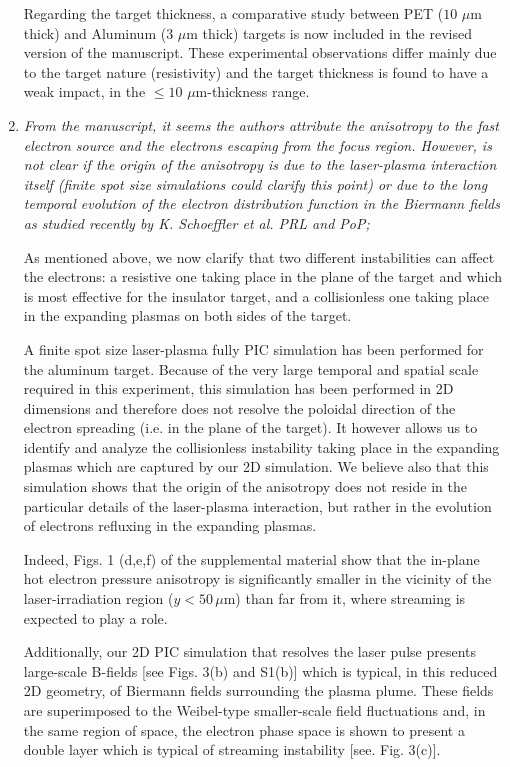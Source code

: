 \documentclass[aps,showpacs,superscriptaddress]{revtex4}%
\begin{document}
\begin{enumerate}
Regarding the target thickness, a comparative study between PET ($10$ $\mu$m thick) and Aluminum  (3 $\mu$m thick)  targets is now included in the revised version of the manuscript. These experimental observations differ mainly due to the target nature (resistivity) and the target thickness is found to have a weak impact, in the $\le 10$  $\mu$m-thickness range.

\item \textit{From the manuscript, it seems the authors attribute the anisotropy to the fast electron source and the electrons escaping from the focus region. However, is not clear if the origin of the anisotropy is due to the laser-plasma interaction itself (finite spot size simulations could clarify this point) or due to the long temporal evolution of the electron distribution function in the Biermann fields as studied recently by K. Schoeffler et al. PRL and PoP;}

As mentioned above, we now clarify that two different instabilities can affect the electrons: a resistive one taking place in the plane of the target and which is most effective for the insulator target, and a collisionless one taking place in the expanding plasmas on both sides of the target.

A finite spot size laser-plasma fully  PIC simulation has been performed for the aluminum target. 
Because of the very large temporal and spatial scale required in this experiment, this simulation has been performed in 2D dimensions and therefore does not resolve the poloidal direction of the electron spreading (i.e. in the plane of the target). It however allows us to identify and analyze the collisionless instability taking place in the expanding plasmas which are captured by our  2D simulation.
We believe also that this simulation shows that the origin of the anisotropy does not reside in the particular details of the laser-plasma interaction, but rather in the evolution of electrons refluxing in the expanding plasmas.

Indeed, Figs. 1 (d,e,f) of the supplemental material show that  the in-plane hot electron pressure anisotropy is significantly smaller
in the vicinity of the laser-irradiation region ($y<50\, \mu$m) than far from it, where streaming is expected to play a role.

Additionally, our 2D PIC simulation that resolves the laser pulse presents large-scale B-fields   [see Figs. 3(b) and S1(b)] which is typical, in this reduced 2D geometry, of Biermann fields surrounding the plasma plume.
These fields are superimposed to the Weibel-type smaller-scale field fluctuations  and, in the same region of space, the electron phase space is shown to present a double layer which is typical of streaming instability [see. Fig. 3(c)].  


\end{enumerate}
\end{document}
